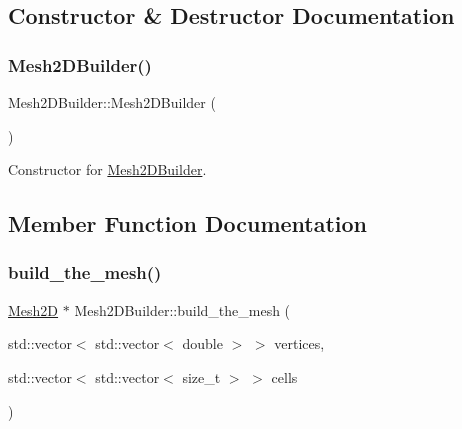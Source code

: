 \subsection{Constructor \& Destructor Documentation}
\mbox{\label{classHArDCore2D_1_1Mesh2DBuilder_aace3b9d1ce3b4e0b53590b75f734dd96}} 
\subsubsection{\texorpdfstring{Mesh2\+D\+Builder()}{Mesh2DBuilder()}}
{\footnotesize\ttfamily Mesh2\+D\+Builder\+::\+Mesh2\+D\+Builder (\begin{DoxyParamCaption}{ }\end{DoxyParamCaption})}

Constructor for \hyperlink{classHArDCore2D_1_1Mesh2DBuilder}{Mesh2\+D\+Builder}. 

\subsection{Member Function Documentation}
\mbox{\label{classHArDCore2D_1_1Mesh2DBuilder_a66379a977bf320cc456c4693b78707c8}} 
\subsubsection{\texorpdfstring{build\+\_\+the\+\_\+mesh()}{build\_the\_mesh()}}
{\footnotesize\ttfamily \hyperlink{classHArDCore2D_1_1Mesh2D}{Mesh2D} $\ast$ Mesh2\+D\+Builder\+::build\+\_\+the\+\_\+mesh (\begin{DoxyParamCaption}\item[{std\+::vector$<$ std\+::vector$<$ double $>$ $>$}]{vertices,  }\item[{std\+::vector$<$ std\+::vector$<$ size\+\_\+t $>$ $>$}]{cells }\end{DoxyParamCaption})}



